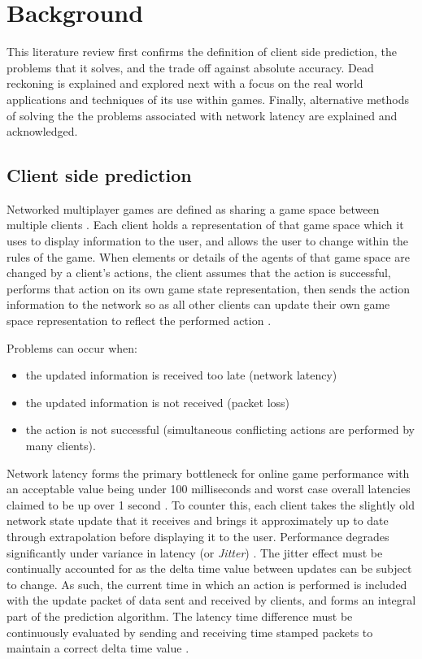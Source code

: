 \documentclass[journal]{IEEEtran}
\begin{document}
\section{Background}

This literature review first confirms the definition of client side prediction, the problems that it solves, and the trade off against absolute accuracy. Dead reckoning is explained and explored next with a focus on the real world applications and techniques of its use within games. Finally, alternative methods of solving the the problems associated with network latency are explained and acknowledged.

\subsection{Client side prediction}

Networked multiplayer games are defined as sharing a game space between multiple clients \cite{diot1999distributed}. Each client holds a representation of that game space which it uses to display information to the user, and allows the user to change within the rules of the game. When elements or details of the agents of that game space are changed by a client's actions, the client assumes that the action is successful, performs that action on its own game state representation, then sends the action information to the network so as all other clients can update their own game space representation to reflect the performed action \cite{bernier2001latency}.

Problems can occur when:
\begin{itemize}
    \item the updated information is received too late (network latency)
    \item the updated information is not received (packet loss)
    \item the action is not successful (simultaneous conflicting actions are performed by many clients).
\end{itemize}

Network latency forms the primary bottleneck for online game performance with an acceptable value being under 100 milliseconds \cite{smed2002aspects} and worst case overall latencies claimed to be up over 1 second \cite{claypool2006latency}. To counter this, each client takes the slightly old network state update that it receives and brings it approximately up to date through extrapolation before displaying it to the user. Performance degrades significantly under variance in latency (or \textit{Jitter}) \cite{beigbeder2004effects} \cite{dick2005analysis}. The jitter effect must be continually accounted for as the delta time value between updates can be subject to change. As such, the current time in which an action is performed is included with the update packet of data sent and received by clients, and forms an integral part of the prediction algorithm. The latency time difference must be continuously evaluated by sending and receiving time stamped packets to maintain a correct delta time value \cite{glazer2015multiplayer}.
\end{document}
